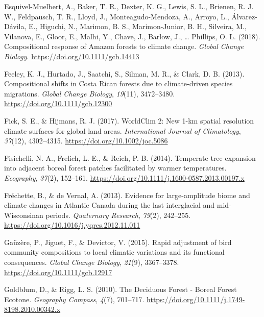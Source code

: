 \documentclass[
  a4paperpaper,
]{article}
\begin{document}
\leavevmode\hypertarget{ref-esquivel-muelbert_compositional_2018}{}%
Esquivel-Muelbert, A., Baker, T. R., Dexter, K. G., Lewis, S. L.,
Brienen, R. J. W., Feldpausch, T. R., Lloyd, J., Monteagudo-Mendoza, A.,
Arroyo, L., Álvarez-Dávila, E., Higuchi, N., Marimon, B. S.,
Marimon-Junior, B. H., Silveira, M., Vilanova, E., Gloor, E., Malhi, Y.,
Chave, J., Barlow, J., \ldots{} Phillips, O. L. (2018). Compositional
response of Amazon forests to climate change. \emph{Global Change
Biology}. \url{https://doi.org/10.1111/gcb.14413}

\leavevmode\hypertarget{ref-feeley_compositional_2013}{}%
Feeley, K. J., Hurtado, J., Saatchi, S., Silman, M. R., \& Clark, D. B.
(2013). Compositional shifts in Costa Rican forests due to
climate-driven species migrations. \emph{Global Change Biology},
\emph{19}(11), 3472--3480. \url{https://doi.org/10.1111/gcb.12300}

\leavevmode\hypertarget{ref-fick_worldclim_2017}{}%
Fick, S. E., \& Hijmans, R. J. (2017). WorldClim 2: New 1-km spatial
resolution climate surfaces for global land areas. \emph{International
Journal of Climatology}, \emph{37}(12), 4302--4315.
\url{https://doi.org/10.1002/joc.5086}

\leavevmode\hypertarget{ref-fisichelli_temperate_2014}{}%
Fisichelli, N. A., Frelich, L. E., \& Reich, P. B. (2014). Temperate
tree expansion into adjacent boreal forest patches facilitated by warmer
temperatures. \emph{Ecography}, \emph{37}(2), 152--161.
\url{https://doi.org/10.1111/j.1600-0587.2013.00197.x}

\leavevmode\hypertarget{ref-frechette_evidence_2013}{}%
Fréchette, B., \& de Vernal, A. (2013). Evidence for large-amplitude
biome and climate changes in Atlantic Canada during the last
interglacial and mid-Wisconsinan periods. \emph{Quaternary Research},
\emph{79}(2), 242--255.
\url{https://doi.org/10.1016/j.yqres.2012.11.011}

\leavevmode\hypertarget{ref-gauzere_rapid_2015}{}%
Gaüzère, P., Jiguet, F., \& Devictor, V. (2015). Rapid adjustment of
bird community compositions to local climatic variations and its
functional consequences. \emph{Global Change Biology}, \emph{21}(9),
3367--3378. \url{https://doi.org/10.1111/gcb.12917}

\leavevmode\hypertarget{ref-goldblum_deciduous_2010}{}%
Goldblum, D., \& Rigg, L. S. (2010). The Deciduous Forest - Boreal
Forest Ecotone. \emph{Geography Compass}, \emph{4}(7), 701--717.
\url{https://doi.org/10.1111/j.1749-8198.2010.00342.x}
\end{document}
